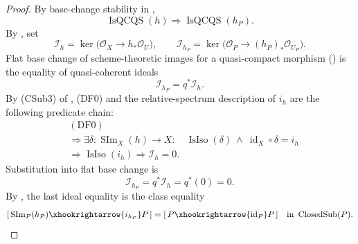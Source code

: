 \begin{proof}
  By base-change stability in
  ,
  \[
    \operatorname{IsQCQS}(h)
      \Longrightarrow\operatorname{IsQCQS}(h_P).
  \]
  By , set
  \[
    \mathcal I_h
      =\ker\bigl(\mathcal O_X\to h_*\mathcal O_U\bigr),
    \qquad
    \mathcal I_{h_P}
      =\ker\bigl(\mathcal O_P\to(h_P)_*\mathcal O_{U_P}\bigr).
  \]
  Flat base change of scheme-theoretic images for a quasi-compact morphism
  (\cite[\href{https://stacks.math.columbia.edu/tag/081I}{Tag 081I}]
  {stacks-project}) is the equality of quasi-coherent ideals
  \[
    \mathcal I_{h_P}=q^*\mathcal I_h.
  \]
  By (CSub3) of , (DF0) and the
  relative-spectrum description of $i_h$ are the following predicate chain:
  \[
  \begin{aligned}
    &(\mathrm{DF0})\\
    &\Longrightarrow
      \exists\delta\colon\operatorname{SIm}_X(h)\to X:\quad
        \operatorname{IsIso}(\delta)\ \wedge\
        \operatorname{id}_X\circ\delta=i_h\\
    &\Longrightarrow\operatorname{IsIso}(i_h)
     \Longrightarrow\mathcal I_h=0.
  \end{aligned}
  \]
  Substitution into flat base change is
  \[
    \mathcal I_{h_P}=q^*\mathcal I_h=q^*(0)=0.
  \]
  By , the last ideal equality is
  the class equality
  \[
    [\,\operatorname{SIm}_P(h_P)\xhookrightarrow{i_{h_P}}P\,]
      =[\,P\xhookrightarrow{\operatorname{id}_P}P\,]
      \quad\text{in }\operatorname{ClosedSub}(P).
  \]
\end{proof}

